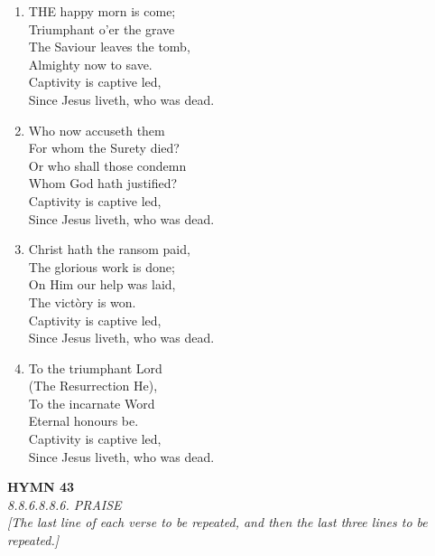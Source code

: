 \documentclass[11pt,a4paper]{article}
\begin{document}
\begin{enumerate}
    \item THE happy morn is come; \\
        Triumphant o'er the grave \\
        The Saviour leaves the tomb, \\
        Almighty now to save. \\
        Captivity is captive led, \\
        Since Jesus liveth, who was dead.

    \item Who now accuseth them \\
        For whom the Surety died? \\
        Or who shall those condemn \\
        Whom God hath justified? \\
        Captivity is captive led, \\
        Since Jesus liveth, who was dead.

    \item Christ hath the ransom paid, \\
        The glorious work is done; \\
        On Him our help was laid, \\
        The vict\`ory is won. \\
        Captivity is captive led, \\
        Since Jesus liveth, who was dead.

    \item To the triumphant Lord \\
        (The Resurrection He), \\
        To the incarnate Word \\
        Eternal honours be. \\
        Captivity is captive led, \\
        Since Jesus liveth, who was dead.

\end{enumerate}

\newpage
\begin{center}
    {\Large \textbf{HYMN 43}}
    \\
    \textit{8.8.6.8.8.6. PRAISE}
    \\
    \textit{\small [The last line of each verse to be repeated, and then the last three lines to be repeated.]}
\end{center}
\vspace{1em}
\end{document}
